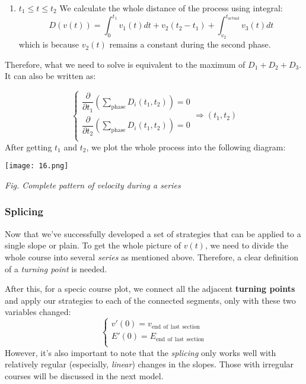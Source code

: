 \documentclass[14pt]{article}
\theoremstyle{definition}
\theoremstyle{remark}
\numberwithin{equation}{section}
\begin{document}
\begin{itemize}
\begin{enumerate}
				\item \(t_1\leq t\leq t_2\)
					We calculate the whole distance of the process using integral:
					\[D(v(t))=\int_0^{t_1}v_1(t)dt+v_2(t_2-t_1)+\int_{v_2}^{t_{\mathrm{actual}}}v_3(t)dt\]
					which is because \(v_2(t)\) remains a constant during the second phase.
				\end{enumerate}
			Therefore, what we need to solve is equivalent to the maximum of \(D_1+D_2+D_3\). It can also be written as:

			\[
				\begin{cases}
					\dfrac{\partial}{\partial t_1}\left( \displaystyle\sum\limits_{\mathrm{phase}}{D_i\left( t_1,t_2 \right)} \right) =0\\
					\dfrac{\partial}{\partial t_2}\left( \displaystyle\sum\limits_{\mathrm{phase}}{D_i\left( t_1,t_2 \right)} \right) =0\\
				\end{cases}\Rightarrow \left( t_1,t_2 \right)
			\]
			After getting \(t_1\) and \(t_2\), we plot the whole process into the following diagram:

			\begin{center}
				\texttt{[image: 16.png]}

				\small\textit{Fig. Complete pattern of velocity during a series}
			\end{center}


	\end{itemize}

	\subsubsection{Splicing}
			Now that we've successfully developed a set of strategies that can be applied to a single slope or plain. To get the whole picture of $v(t)$, we need to divide the whole course into several \textit{series} as mentioned above. Therefore, a clear definition of a \textit{turning point} is needed.

			After this, for a specic course plot, we connect all the adjacent \textbf{turning points} and apply our strategies to each of the connected segments, only with these two variables changed:
			$$
			\left\{ \begin{array}{c}
				v\prime\left( 0 \right) =v_{\mathrm{end}\:\:\mathrm{of}\:\:\mathrm{last}\:\:\mathrm{section}}\\
				E\prime\left( 0 \right) =E_{\mathrm{end}\:\:\mathrm{of}\:\:\mathrm{last}\:\:\mathrm{section}}\\
			\end{array} \right.
			$$
			However, it's also important to note that the \textit{splicing} only works well with relatively regular (especially, \textit{linear}) changes in the slopes. Those with irregular courses will be discussed in the next model.
\end{document}

